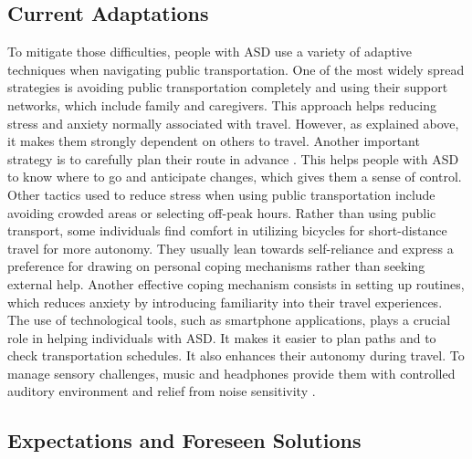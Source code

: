 \subsection{Current Adaptations}

   To mitigate those difficulties, people with ASD use a variety of adaptive techniques when navigating public transportation. 
   \newline
   \newline
   One of the most widely spread strategies is avoiding public transportation completely and using their support networks, which include family and caregivers\cite{deka_co-principal_nodate}. This approach helps reducing stress and anxiety normally associated with travel. However, as explained above, it makes them strongly dependent on others to travel. 
   \newline
   \newline
    Another important strategy is to carefully plan their route in advance \cite{haas_experiences_nodate}. This helps people with ASD to know where to go and anticipate changes, which gives them a sense of control. Other tactics used to reduce stress when using public transportation include avoiding crowded areas or selecting off-peak hours.
\newline
\newline
   Rather than using public transport, some individuals find comfort in utilizing bicycles for short-distance travel \cite{falkmer_viewpoints_2015} for more autonomy. They usually lean towards self-reliance and express a preference for drawing on personal coping mechanisms rather than seeking external help. Another effective coping mechanism consists in setting up routines\cite{falkmer_viewpoints_2015}, which reduces anxiety by introducing familiarity into their travel experiences. 
   \newline
   \newline
   The use of technological tools, such as smartphone applications, plays a crucial role in helping individuals with ASD. It makes it easier to plan paths and to check transportation schedules. It also enhances their autonomy during travel. To manage sensory challenges, music and headphones provide them with controlled auditory environment and relief from noise sensitivity \cite{haas_experiences_nodate}. 


\subsection{Expectations and Foreseen Solutions}

